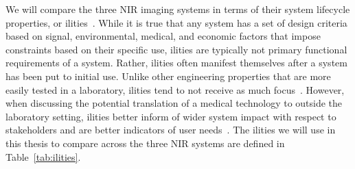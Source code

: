 We will compare the three \ac{NIR} imaging systems in terms of their system lifecycle properties, or ilities~\cite{DeWeck2012}. While it is true that any system has a set of design criteria based on signal, environmental, medical, and economic factors that impose constraints based on their specific use, ilities are typically not primary functional requirements of a system. Rather, ilities often manifest themselves after a system has been put to initial use. Unlike other engineering properties that are more easily tested in a laboratory, ilities tend to not receive as much focus~\cite{DeWeck2012}. However, when discussing the potential translation of a medical technology to outside the laboratory setting, ilities better inform of wider system impact with respect to stakeholders and are better indicators of user needs~\cite{DeWeck2011}. The ilities we will use in this thesis to compare across the three \ac{NIR} systems are defined in Table~\ref{tab:ilities}. 

